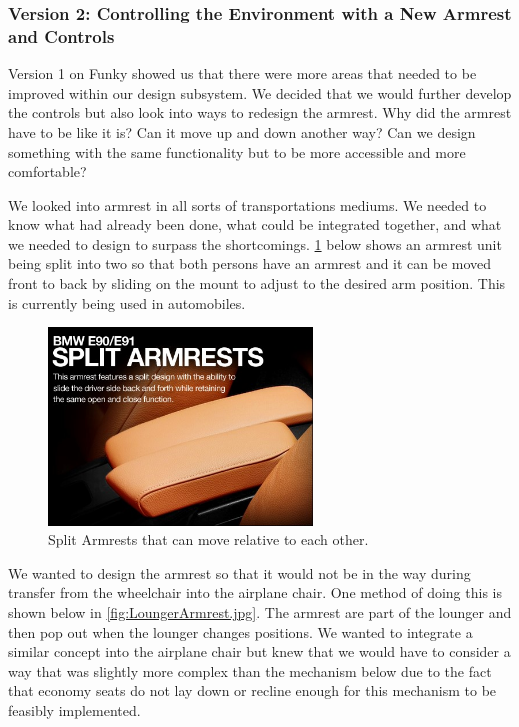 \subsubsection{Version 2: Controlling the Environment with a New Armrest and Controls}

Version 1 on Funky showed us that there were more areas that needed to be improved within our design subsystem.  We decided that we would further develop the controls but also look into ways to redesign the armrest.  Why did the armrest have to be like it is? Can it move up and down another way? Can we design something with the same functionality but to be more accessible and more comfortable?

We looked into armrest in all sorts of transportations mediums. We needed to know what had already been done, what could be integrated together, and what we needed to design to surpass the shortcomings.   \ref{fig:SplitArmrests.jpg} below shows an armrest unit being split into two so that both persons have an armrest and it can be moved front to back by sliding on the mount to adjust to the desired arm position. This is currently being used in automobiles.


\begin{figure}[h]
  \centering
     \includegraphics[width=7cm]{images/SplitArmrests.jpg}
   \caption{Split Armrests that can move relative to each other.\cite{splitarmrest} }
  \label{fig:SplitArmrests.jpg}
\end{figure}

We wanted to design the armrest so that it would not be in the way during transfer from the wheelchair into the airplane chair.  One method of doing this is shown below in  \ref{fig:LoungerArmrest.jpg}.  The armrest are part of the lounger and then pop out when the lounger changes positions.  We wanted to integrate a similar concept into the airplane chair but knew that we would have to consider a way that was slightly more complex than the mechanism below due to the fact that economy seats do not lay down or recline enough for this mechanism to be feasibly implemented. 


